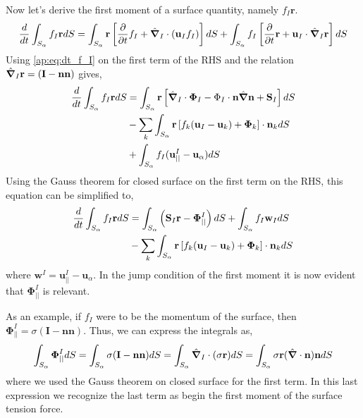 Now let's derive the first moment of a surface quantity, namely $f_I \textbf{r}$. 
\begin{align*}
    \frac{d}{d t} \int_{S_\alpha} f_I \textbf{r} dS
    &= \int_{S_\alpha} \textbf{r}\left[
        \frac{\partial}{\partial t} f_I 
        + \hat{\bm{\nabla}}_I \cdot (\textbf{u}_If_I) 
    \right]dS
    + \int_{S_\alpha}
    f_I \left[
        \frac{\partial}{\partial t} \textbf{r} + \textbf{u}_I \cdot \hat{\bm{\nabla}}_I \textbf{r}
    \right]
    dS\\
\end{align*}
Using \ref{ap:eq:dt_f_I} on the first term of the RHS and the relation $\hat{\bm{\nabla}}_I \textbf{r} = (\textbf{I} - \textbf{nn})$ gives, 
\begin{align*}
    \frac{d}{d t} \int_{S_\alpha} f_I \textbf{r} dS
    &= \int_{S_\alpha} \textbf{r}\left[
        \hat{\bm{\nabla}}_I \cdot \mathbf{\Phi}_I
        - \Phi_I\cdot\textbf{n}\hat{\bm{\nabla}}\textbf{n}
        + \textbf{S}_I
    \right] dS\\
    & - \sum_k \int_{S_\alpha}\textbf{r} \left[
        f_k (\textbf{u}_I - \textbf{u}_k)
        + \mathbf{\Phi}_k
    \right] \cdot \textbf{n}_k
    dS\\
    &+ \int_{S_\alpha}
    f_I (\textbf{u}^I_{||} - \textbf{u}_\alpha)
    dS\\
\end{align*}
Using the Gauss theorem for closed surface on the first term on the RHS, this equation can be simplified to, 
\begin{align}
    \frac{d}{d t} \int_{S_\alpha} f_I \textbf{r} dS
    &= \int_{S_\alpha} \left(
        \textbf{S}_I\textbf{r}
        - \mathbf{\Phi}_{||}^I
    \right) dS
    + \int_{S_\alpha}
    f_I \textbf{w}_I
    dS\nonumber\\
    & - \sum_k \int_{S_\alpha}\textbf{r} \left[
        f_k (\textbf{u}_I - \textbf{u}_k)
        + \mathbf{\Phi}_k
    \right] \cdot \textbf{n}_k
    dS
    \label{ap:eq:dt_r_f_I}
\end{align}
where $\textbf{w}^I = \textbf{u}^I_{||} - \textbf{u}_\alpha$. 
In the jump condition of the first moment it is now evident that $\mathbf{\Phi}^I_{||}$ is relevant. 

As an example, if $f_I$ were to be the momentum of the surface, then $\mathbf{\Phi}_{||}^I = \sigma (\textbf{I} - \textbf{nn})$. 
Thus, we can express the integrals as, 
\begin{equation*}
    \int_{S_\alpha}\mathbf{\Phi}_{||}^IdS
    =\int_{S_\alpha} \sigma (\textbf{I} - \textbf{nn}) dS
    =\int_{S_\alpha} \hat{\bm{\nabla}}_I \cdot (\sigma \textbf{r}) dS
    =\int_{S_\alpha} \sigma \textbf{r} (\hat{\bm{\nabla}}\cdot\textbf{n}) \textbf{n} dS
\end{equation*} 
where we used the Gauss theorem on closed surface for the first term. 
In this last expression we recognize the last term as begin the first moment of the surface tension force. 




